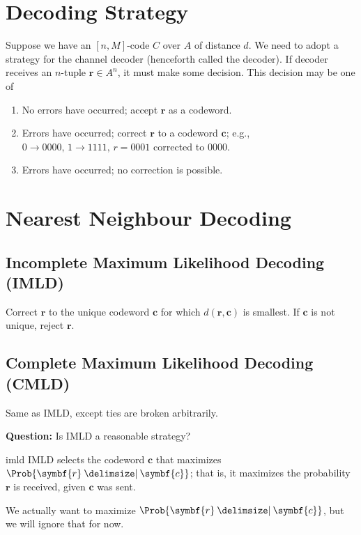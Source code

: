 
\section{Decoding Strategy}
Suppose we have an $ [n,M] $-code $ C $ over $ A $ of distance $ d $.
We need to adopt a strategy for the channel decoder (henceforth called the decoder).
If decoder receives an $ n $-tuple $ \symbf{r}\in A^n $, it must make some decision.
This decision may be one of
\begin{enumerate}[label=(\roman*)]
    \item No errors have occurred; accept $ \symbf{r} $ as a codeword.
    \item Errors have occurred; correct $ \symbf{r} $ to a codeword $ \symbf{c} $;
          e.g., $ 0 \rightarrow 0000,\,1 \rightarrow 1111,\,r=0001 $ corrected to
          $ 0000 $.
    \item Errors have occurred; no correction is possible.
\end{enumerate}

\section{Nearest Neighbour Decoding}
\subsection*{Incomplete Maximum Likelihood Decoding (IMLD)}
Correct $ \symbf{r} $ to the unique codeword $ \symbf{c} $ for which
$ d(\symbf{r},\symbf{c}) $ is smallest.
If $ \symbf{c} $ is not unique, reject $ \symbf{r} $.
\subsection*{Complete Maximum Likelihood Decoding (CMLD)}
Same as IMLD, except ties are broken arbitrarily.

\textbf{Question:} Is IMLD a reasonable strategy?

\begin{Theorem}{}{imld}
    IMLD selects the codeword $ \symbf{c} $ that maximizes $ \Prob{\symbf{r}\given \symbf{c}} $; that is,
    it maximizes the probability $ \symbf{r} $ is received, given $ \symbf{c} $ was sent.
\end{Theorem}

We actually want to maximize $ \Prob{\symbf{r}\given \symbf{c}} $, but we will ignore that for now.

